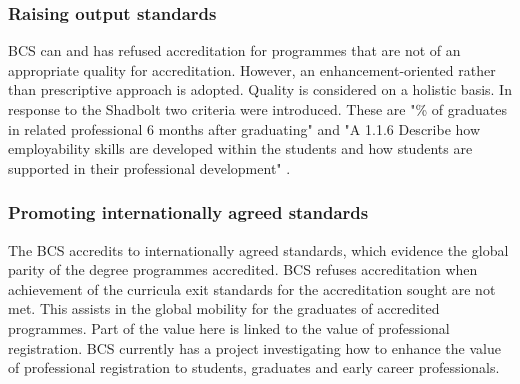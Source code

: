 \documentclass[sigconf]{acmart}
\begin{document}
\subsubsection{Raising output standards}
\begin{comment}
version 1
BCS refuses accreditation for programmes that do not meet the expected output standards or when achievement of the curricula exit standards for the accreditation sought are not met. "\% of graduates in related professional 6 months after graduating" \cite[p8]{BCS2019b} is the employability output standard applied to each programme. Departments are also requested to  "A 1.1.6 Describe how employability skills are developed within the students and how students are supported in their professional developmesion nt" \cite [p3]{BCS2019b}. Both these criteria were introduced in response to Shadbolt.
\end{comment}
\begin{comment}
version 2
BCS refuses accreditation for programmes that do not meet the expected output standards. "\% of graduates in related professional 6 months after graduating" \cite[p8]{BCS2019b} is the employability output standard applied to each programme. Departments are also requested to  "A 1.1.6 Describe how employability skills are developed within the students and how students are supported in their professional development" \cite [p3]{BCS2019b}. Both these criteria were introduced in response to Shadbolt.
\end{comment}
BCS can and has refused accreditation for programmes that are not of an appropriate quality for accreditation. However, an enhancement-oriented rather than prescriptive approach is adopted. Quality is considered on a holistic basis. In response to the Shadbolt two criteria were introduced. These are "\% of graduates in related professional 6 months after graduating"  \cite [p8]{BCS2019b} and "A 1.1.6 Describe how employability skills are developed within the students and how students are supported in their professional development" \cite [p8]{BCS2019b}.
\subsubsection{Promoting internationally agreed standards}
The BCS accredits to internationally agreed standards, which evidence the global parity of the degree programmes accredited. BCS refuses accreditation when achievement of the curricula exit standards for the accreditation sought are not met.  This assists in the global mobility for the graduates of accredited programmes. Part of the value here is linked to the value of professional registration. BCS currently has a project investigating how to enhance the value of professional registration to students, graduates and early career professionals.
\end{document}
